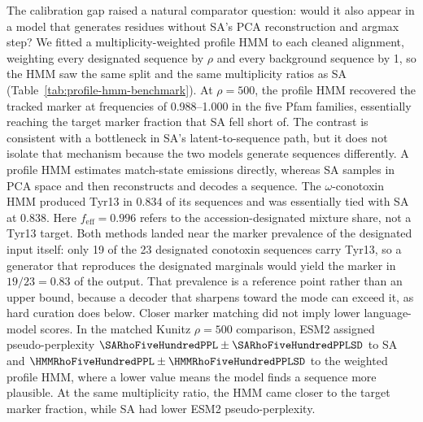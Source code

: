 The calibration gap raised a natural comparator question: would it also appear in a model that
generates residues without SA's PCA reconstruction and argmax step?
We fitted a multiplicity-weighted profile HMM to each cleaned alignment, weighting every
designated sequence by $\rho$ and every background sequence by 1, so the HMM saw the same
split and the same multiplicity ratios as SA (Table~\ref{tab:profile-hmm-benchmark}). At
$\rho=500$, the profile HMM recovered the tracked marker at frequencies of 0.988--1.000 in the
five Pfam families, essentially reaching the target marker fraction that SA fell short of. The
contrast is consistent with a bottleneck in SA's latent-to-sequence path, but it does not isolate
that mechanism because the two models generate sequences differently. A profile HMM estimates
match-state emissions directly, whereas SA samples in PCA space and then reconstructs and
decodes a sequence. The $\omega$-conotoxin HMM produced Tyr13 in 0.834 of
its sequences and was essentially tied with SA at 0.838. Here $f_{\mathrm{eff}}=0.996$ refers
to the accession-designated mixture share, not a Tyr13 target. Both methods landed near
the marker prevalence of the designated input itself: only 19 of the 23 designated conotoxin
sequences carry Tyr13, so a generator that reproduces the designated marginals would yield the
marker in $19/23 = 0.83$ of the output. That prevalence is a reference point rather than an
upper bound, because a decoder that sharpens toward the mode can exceed it, as hard curation
does below. Closer marker matching did not imply lower language-model scores. In the matched
Kunitz $\rho=500$ comparison, ESM2 assigned pseudo-perplexity
$\SARhoFiveHundredPPL\pm\SARhoFiveHundredPPLSD$ to SA and
$\HMMRhoFiveHundredPPL\pm\HMMRhoFiveHundredPPLSD$ to the weighted profile HMM, where a lower
value means the model finds a sequence more plausible. At the same multiplicity ratio, the HMM
came closer to the target marker fraction, while SA had lower ESM2 pseudo-perplexity.

